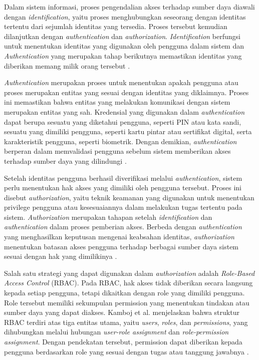 Dalam sistem informasi, proses pengendalian akses terhadap sumber daya diawali dengan \textit{identification}, yaitu proses menghubungkan seseorang dengan identitas tertentu dari sejumlah identitas yang tersedia. Proses tersebut kemudian dilanjutkan dengan \textit{authentication} dan \textit{authorization}. \textit{Identification} berfungsi untuk menentukan identitas yang digunakan oleh pengguna dalam sistem dan \textit{Authentication} yang merupakan tahap berikutnya memastikan identitas yang diberikan memang milik orang tersebut \parencite{Bucko2023}.

\textit{Authentication} merupakan proses untuk menentukan apakah pengguna atau proses merupakan entitas yang sesuai dengan identitas yang diklaimnya. Proses ini memastikan bahwa entitas yang melakukan komunikasi dengan sistem merupakan entitas yang sah. Kredensial yang digunakan dalam \textit{authentication} dapat berupa sesuatu yang diketahui pengguna, seperti PIN atau kata sandi, sesuatu yang dimiliki pengguna, seperti kartu pintar atau sertifikat digital, serta karakteristik pengguna, seperti biometrik. Dengan demikian, \textit{authentication} berperan dalam memvalidasi pengguna sebelum sistem memberikan akses terhadap sumber daya yang dilindungi \parencite{Bucko2023}.

Setelah identitas pengguna berhasil diverifikasi melalui \textit{authentication}, sistem perlu menentukan hak akses yang dimiliki oleh pengguna tersebut. Proses ini disebut \textit{authorization}, yaitu teknik keamanan yang digunakan untuk menentukan privilege pengguna atau kesesuaiannya dalam melakukan tugas tertentu pada sistem. \textit{Authorization} merupakan tahapan setelah \textit{identification} dan \textit{authentication} dalam proses pemberian akses. Berbeda dengan \textit{authentication} yang menghasilkan keputusan mengenai keabsahan identitas, \textit{authorization} menentukan batasan akses pengguna terhadap berbagai sumber daya sistem sesuai dengan hak yang dimilikinya \parencite{Bucko2023}.

Salah satu strategi yang dapat digunakan dalam \textit{authorization} adalah \textit{Role-Based Access Control} (RBAC). Pada RBAC, hak akses tidak diberikan secara langsung kepada setiap pengguna, tetapi dikaitkan dengan role yang dimiliki pengguna. Role tersebut memiliki sekumpulan permission yang menentukan tindakan atau sumber daya yang dapat diakses. Kamboj et al. menjelaskan bahwa struktur RBAC terdiri atas tiga entitas utama, yaitu \textit{users}, \textit{roles}, dan \textit{permissions}, yang dihubungkan melalui hubungan \textit{user-role assignment} dan \textit{role-permission assignment}. Dengan pendekatan tersebut, permission dapat diberikan kepada pengguna berdasarkan role yang sesuai dengan tugas atau tanggung jawabnya \parencite{Kamboj2021}.

